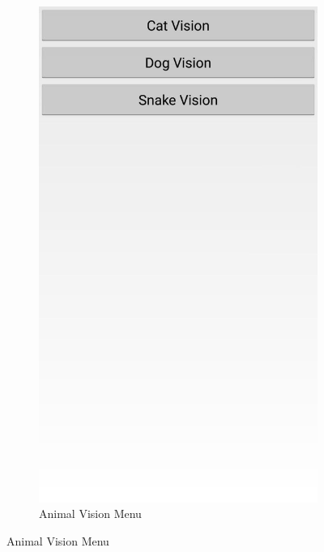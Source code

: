 \documentclass[12pt]{article}
\begin{document}
\begin{figure}[h]
\begin{subfigure}{.25\textwidth}
	\includegraphics[width=.9\linewidth]{ApplicationScreenshots/AnimalVision.jpg}
	\caption*{Animal Vision Menu}
\end{subfigure}
\end{figure}



\end{document}
